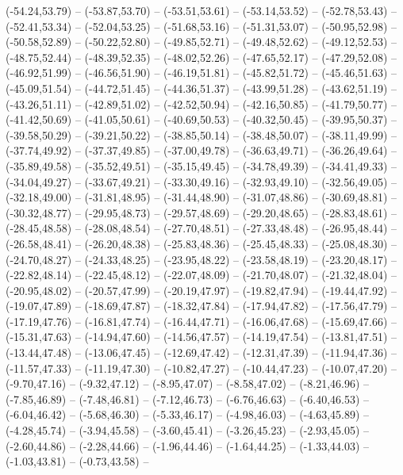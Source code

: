{  (-54.24,53.79) -- (-53.87,53.70) -- (-53.51,53.61) -- (-53.14,53.52) -- (-52.78,53.43) -- (-52.41,53.34) -- (-52.04,53.25) --
  (-51.68,53.16) -- (-51.31,53.07) -- (-50.95,52.98) -- (-50.58,52.89) -- (-50.22,52.80) -- (-49.85,52.71) -- (-49.48,52.62) --
  (-49.12,52.53) -- (-48.75,52.44) -- (-48.39,52.35) -- (-48.02,52.26) -- (-47.65,52.17) -- (-47.29,52.08) -- (-46.92,51.99) --
  (-46.56,51.90) -- (-46.19,51.81) -- (-45.82,51.72) -- (-45.46,51.63) -- (-45.09,51.54) -- (-44.72,51.45) -- (-44.36,51.37) --
  (-43.99,51.28) -- (-43.62,51.19) -- (-43.26,51.11) -- (-42.89,51.02) -- (-42.52,50.94) -- (-42.16,50.85) -- (-41.79,50.77) --
  (-41.42,50.69) -- (-41.05,50.61) -- (-40.69,50.53) -- (-40.32,50.45) -- (-39.95,50.37) -- (-39.58,50.29) -- (-39.21,50.22) --
  (-38.85,50.14) -- (-38.48,50.07) -- (-38.11,49.99) -- (-37.74,49.92) -- (-37.37,49.85) -- (-37.00,49.78) -- (-36.63,49.71) --
  (-36.26,49.64) -- (-35.89,49.58) -- (-35.52,49.51) -- (-35.15,49.45) -- (-34.78,49.39) -- (-34.41,49.33) -- (-34.04,49.27) --
  (-33.67,49.21) -- (-33.30,49.16) -- (-32.93,49.10) -- (-32.56,49.05) -- (-32.18,49.00) -- (-31.81,48.95) -- (-31.44,48.90) --
  (-31.07,48.86) -- (-30.69,48.81) -- (-30.32,48.77) -- (-29.95,48.73) -- (-29.57,48.69) -- (-29.20,48.65) -- (-28.83,48.61) --
  (-28.45,48.58) -- (-28.08,48.54) -- (-27.70,48.51) -- (-27.33,48.48) -- (-26.95,48.44) -- (-26.58,48.41) -- (-26.20,48.38) --
  (-25.83,48.36) -- (-25.45,48.33) -- (-25.08,48.30) -- (-24.70,48.27) -- (-24.33,48.25) -- (-23.95,48.22) -- (-23.58,48.19) --
  (-23.20,48.17) -- (-22.82,48.14) -- (-22.45,48.12) -- (-22.07,48.09) -- (-21.70,48.07) -- (-21.32,48.04) -- (-20.95,48.02) --
  (-20.57,47.99) -- (-20.19,47.97) -- (-19.82,47.94) -- (-19.44,47.92) -- (-19.07,47.89) -- (-18.69,47.87) -- (-18.32,47.84) --
  (-17.94,47.82) -- (-17.56,47.79) -- (-17.19,47.76) -- (-16.81,47.74) -- (-16.44,47.71) -- (-16.06,47.68) -- (-15.69,47.66) --
  (-15.31,47.63) -- (-14.94,47.60) -- (-14.56,47.57) -- (-14.19,47.54) -- (-13.81,47.51) -- (-13.44,47.48) -- (-13.06,47.45) --
  (-12.69,47.42) -- (-12.31,47.39) -- (-11.94,47.36) -- (-11.57,47.33) -- (-11.19,47.30) -- (-10.82,47.27) -- (-10.44,47.23) --
  (-10.07,47.20) -- (-9.70,47.16) -- (-9.32,47.12) -- (-8.95,47.07) -- (-8.58,47.02) -- (-8.21,46.96) -- (-7.85,46.89) --
  (-7.48,46.81) -- (-7.12,46.73) -- (-6.76,46.63) -- (-6.40,46.53) -- (-6.04,46.42) -- (-5.68,46.30) -- (-5.33,46.17) --
  (-4.98,46.03) -- (-4.63,45.89) -- (-4.28,45.74) -- (-3.94,45.58) -- (-3.60,45.41) -- (-3.26,45.23) -- (-2.93,45.05) --
  (-2.60,44.86) -- (-2.28,44.66) -- (-1.96,44.46) -- (-1.64,44.25) -- (-1.33,44.03) -- (-1.03,43.81) -- (-0.73,43.58) --
}

